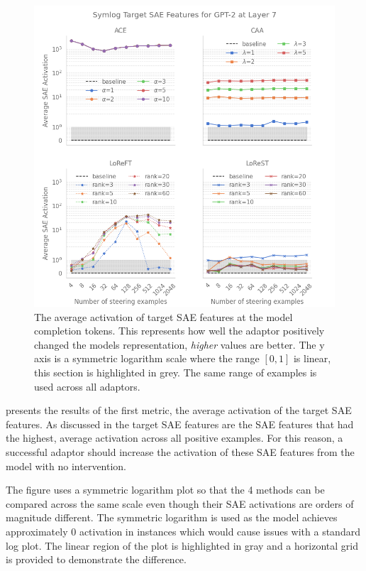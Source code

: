 \begin{figure}
    \centering
    \captionsetup{width=\textwidth}
    \includegraphics[width=\textwidth]{figures/gpt2_7_target.png}
    \caption{
        The average activation of target SAE features at the model completion tokens.
        This represents how well the adaptor positively changed the models representation, \emph{higher} values are better.
        The y axis is a symmetric logarithm scale where the range $[0,1]$ is linear, this section is highlighted in grey.
        The same range of examples is used across all adaptors.
    }
    \label{fig:gpt-pp-target}
\end{figure}

 presents the results of the first metric, the average activation of the target SAE features.
As discussed in  the target SAE features are the SAE features that had the highest, average activation across all positive examples.
For this reason, a successful adaptor should increase the activation of these SAE features from the model with no intervention.

The figure uses a symmetric logarithm plot so that the 4 methods can be compared across the same scale even though their SAE activations are orders of magnitude different.
The symmetric logarithm is used as the model achieves approximately 0 activation in instances which would cause issues with a standard log plot.
The linear region of the plot is highlighted in gray and a horizontal grid is provided to demonstrate the difference.

